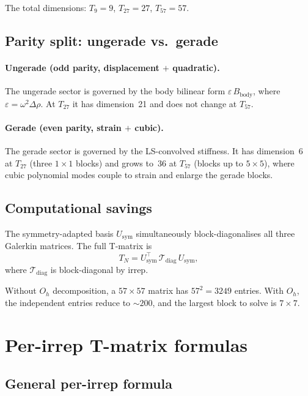 \documentclass[11pt,a4paper]{article}
\newcommand{\D}{\Delta}
\newcommand{\Oh}{O_h}
\newcommand{\Tmat}{\mathcal{T}}
\newcommand{\Usym}{U_{\mathrm{sym}}}
\theoremstyle{plain}
\theoremstyle{definition}
\theoremstyle{remark}
\begin{document}
The total dimensions: $T_9 = 9$, $T_{27} = 27$, $T_{57} = 57$.

\subsection{Parity split: ungerade vs.\ gerade}

\paragraph{Ungerade (odd parity, displacement $+$ quadratic).}
The ungerade sector is governed by the body bilinear form
$\varepsilon\,B_{\mathrm{body}}$, where $\varepsilon = \omega^2\D\rho$.
At $T_{27}$ it has dimension~21 and does not change at $T_{57}$.

\paragraph{Gerade (even parity, strain $+$ cubic).}
The gerade sector is governed by the LS-convolved stiffness.  It has
dimension~6 at $T_{27}$ (three $1\times 1$ blocks) and grows to~36
at $T_{57}$ (blocks up to $5\times 5$), where cubic polynomial modes
couple to strain and enlarge the gerade blocks.

\subsection{Computational savings}

The symmetry-adapted basis $\Usym$ simultaneously block-diagonalises
all three Galerkin matrices.  The full T-matrix is
\begin{equation}
  T_N = \Usym^\top\,\Tmat_{\mathrm{diag}}\,\Usym,
  \label{eq:T-assembly}
\end{equation}
where $\Tmat_{\mathrm{diag}}$ is block-diagonal by irrep.

Without $\Oh$ decomposition, a $57 \times 57$ matrix has
$57^2 = 3249$ entries.  With $\Oh$, the independent entries reduce
to $\sim 200$, and the largest block to solve is $7 \times 7$.


\section{Per-irrep T-matrix formulas}
\label{sec:per-irrep}

\subsection{General per-irrep formula}
\end{document}
